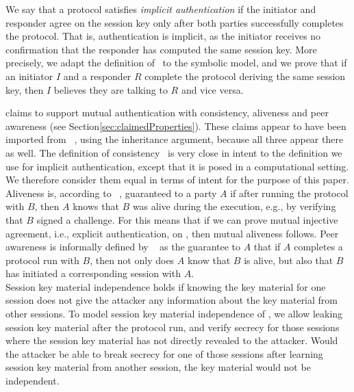 %
We say that a protocol satisfies \emph{implicit authentication} if the
initiator and responder agree on the session key only after both parties
successfully completes the protocol.
%
That is, authentication is implicit, as the
initiator receives no confirmation that the responder has computed the same session key.
%
More precisely, we adapt the definition of~\cite{DBLP:journals/iacr/GuilhemFW19}
to the symbolic model, and we prove that if an initiator $I$ and a responder $R$
complete the protocol deriving the same session key, then $I$ believes they are
talking to $R$ and vice versa.
%

\mEdhoc{} claims to support mutual authentication with consistency, aliveness
and peer awareness (see Section\ref{sec:claimedProperties}).
%
These claims appear to have been imported from \mSigma{}~\cite{sigma}, using the
inheritance argument, because all three appear there as well.
%
The definition of consistency~\cite{sigma} is very close in intent to the
definition we use for implicit authentication, except that it is posed in a
computational setting.
%
We therefore consider them equal in terms of intent for the purpose of this
paper.
%
Aliveness is, according to \mSigma{}~\cite{sigma}, guaranteed to a party $A$ if
after running the protocol with $B$, then $A$ knows that $B$ was alive during
the execution, e.g., by verifying that $B$ signed a challenge.
%
For \mEdhoc{} this means that if we can prove mutual injective agreement, i.e.,
explicit authentication, on \mGxy{}, then mutual aliveness follows.
%
Peer awareness is informally defined by \mSigma{}~\cite{sigma} as the guarantee
to $A$ that if $A$ completes a protocol run with $B$, then not only does $A$
know that $B$ is alive, but also that $B$ has initiated a corresponding session
with $A$.
\\

Session key material independence holds if knowing the key material for one
session does not give the attacker any information about the key material from
other sessions.  To model session
key material independence of \mEdhoc, we allow leaking session key material
after the protocol run, and verify secrecy for those sessions where the
session key material has not directly revealed to the attacker.
Would the attacker be able to break secrecy for one of those sessions after
learning session key material from another session, the key material would not 
be independent.\\


